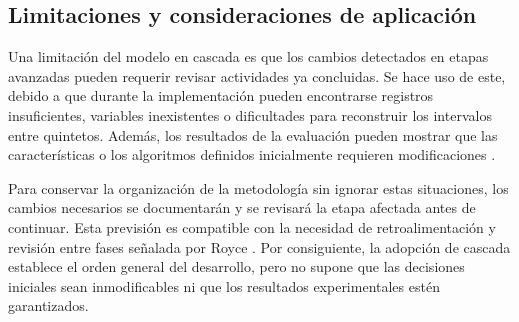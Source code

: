 \subsection{Limitaciones y consideraciones de aplicación}

Una limitación del modelo en cascada es que los cambios detectados en etapas avanzadas pueden requerir revisar actividades ya concluidas. Se hace uso de este, debido a que durante la implementación pueden encontrarse registros insuficientes, variables inexistentes o dificultades para reconstruir los intervalos entre quintetos. Además, los resultados de la evaluación pueden mostrar que las características o los algoritmos definidos inicialmente requieren modificaciones \cite{sommerville2016software,ibmWaterfallAdvantages}.

Para conservar la organización de la metodología sin ignorar estas situaciones, los cambios necesarios se documentarán y se revisará la etapa afectada antes de continuar. Esta previsión es compatible con la necesidad de retroalimentación y revisión entre fases señalada por Royce \cite{royce1970large}. Por consiguiente, la adopción de cascada establece el orden general del desarrollo, pero no supone que las decisiones iniciales sean inmodificables ni que los resultados experimentales estén garantizados.